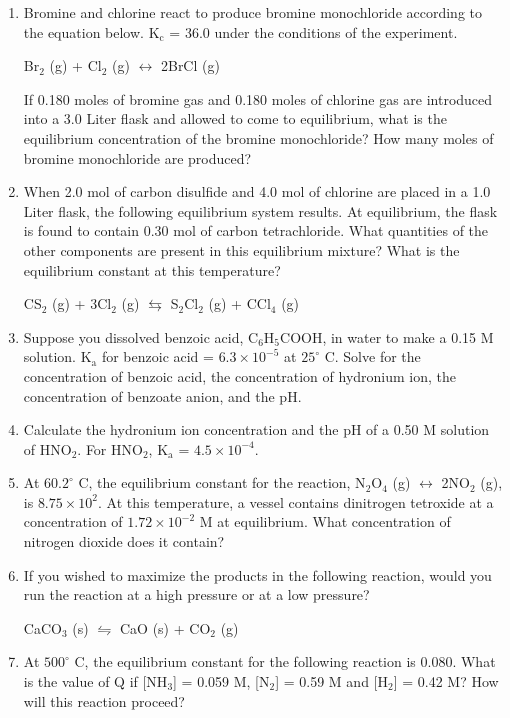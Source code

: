 \documentclass[../hchem.tex]{subfiles}
\begin{document}
\begin{enumerate}
    \item Bromine and chlorine react to produce bromine monochloride according to the equation below. K$_\text{c}$ = 36.0 under the conditions of the experiment.
    \begin{center}
        Br$_2$ (g) + Cl$_2$ (g) $\leftrightarrow$ 2BrCl (g)
    \end{center}
    If 0.180 moles of bromine gas and 0.180 moles of chlorine gas are introduced into a 3.0 Liter flask and allowed to come to equilibrium, what is the equilibrium concentration of the bromine monochloride? How many moles of bromine monochloride are produced?
    \item When 2.0 mol of carbon disulfide and 4.0 mol of chlorine are placed in a 1.0 Liter flask, the following equilibrium system results. At equilibrium, the flask is found to contain 0.30 mol of carbon tetrachloride. 
    What quantities of the other components are present in this equilibrium mixture? What is the equilibrium constant at this temperature?
    \begin{center}
        CS$_2$ (g) + 3Cl$_2$ (g) $\leftrightarrows$ S$_2$Cl$_2$ (g) + CCl$_4$ (g)
    \end{center}
    \item Suppose you dissolved benzoic acid, C$_6$H$_5$COOH, in water to make a 0.15 M solution. K$_\text{a}$ for benzoic acid = $6.3\times 10^{-5}$ at $25^{\circ}$ C. Solve for the concentration of benzoic acid, the concentration of hydronium ion, the concentration of benzoate anion, and the pH.
    \item Calculate the hydronium ion concentration and the pH of a 0.50 M solution of HNO$_2$. For HNO$_2$, K$_{\text{a}}$ = $4.5\times 10^{-4}$.
    \item At $60.2^{\circ}$ C, the equilibrium constant for the reaction, N$_2$O$_4$ (g) $\leftrightarrow$ 2NO$_2$ (g), is $8.75\times 10^2$. At this temperature, a vessel contains dinitrogen tetroxide at a concentration of $1.72\times 10^{-2}$ M at equilibrium. What concentration of nitrogen dioxide does it contain?
    \item If you wished to maximize the products in the following reaction, would you run the reaction at a high pressure or at a low pressure?
    \begin{center}
        CaCO$_3$ (s) $\leftrightharpoons$ CaO (s) + CO$_2$ (g)
    \end{center}
    \item At $500^{\circ}$ C, the equilibrium constant for the following reaction is 0.080. What is the value of Q if [NH$_3$] = 0.059 M, [N$_2$] = 0.59 M and [H$_2$] = 0.42 M? How will this reaction proceed?

\end{enumerate}
\end{document}
